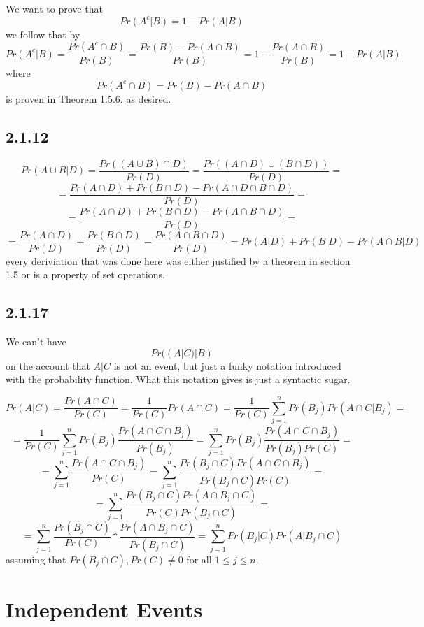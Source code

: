 \documentclass[11pt,oneside,titlepage]{book}
\begin{document}
We want to prove that
$$Pr(A^c|B) = 1 - Pr(A|B)$$
we follow that by
$$Pr(A^c|B) = \frac{Pr(A^c \cap B)}{Pr(B)} = \frac{Pr(B) - Pr(A \cap B)}{Pr(B)} =
1 - \frac{Pr(A \cap B)}{Pr(B)} = 1 - Pr(A|B)$$
where
$$Pr(A^c \cap B) = Pr(B) - Pr(A \cap B)$$
is proven in Theorem 1.5.6.
as desired.

\subsection*{2.1.12}

$$Pr(A \cup B | D) = \frac{Pr((A \cup B) \cap D)}{Pr(D)} =
\frac{Pr((A \cap D) \cup (B \cap D))}{Pr(D)} = $$
$$ =
\frac{Pr(A \cap D) + Pr(B \cap D) - Pr(A \cap D \cap B \cap D)}{Pr(D)} = $$
$$ =  \frac{Pr(A \cap D) + Pr(B \cap D) - Pr(A \cap B \cap D)}{Pr(D)} =  $$
$$ =  \frac{Pr(A \cap D)}{Pr(D)} + \frac{Pr(B \cap D)}{Pr(D)}
- \frac{Pr(A \cap B \cap D)}{Pr(D)} =  Pr(A|D) + Pr(B|D) - Pr(A \cap B|D)$$
every deriviation that was done here was either justified by a theorem in section 1.5 or
is a property of set operations.

\subsection*{2.1.17}

We can't have
$$Pr((A|C)|B)$$
on the account that $A|C$ is not an event, but just a funky notation introduced with the
probability function. What this notation gives is just a syntactic sugar.

$$Pr(A|C) = \frac{Pr(A \cap C)}{Pr(C)} = \frac{1}{Pr(C)} Pr(A \cap C) =
\frac{1}{Pr(C)} \sum_{j = 1}^n{Pr(B_j)Pr(A \cap C | B_j)} = 
$$
$$ =
\frac{1}{Pr(C)} \sum_{j = 1}^n{Pr(B_j)\frac{Pr(A \cap C \cap B_j)}{Pr(B_j)}} =
\sum_{j = 1}^n{Pr(B_j)\frac{Pr(A \cap C \cap B_j)}{Pr(B_j)Pr(C)}} = 
$$
$$ =
\sum_{j = 1}^n{\frac{Pr(A \cap C \cap B_j)}{Pr(C)}} =
\sum_{j = 1}^n{\frac{Pr(B_j \cap C) Pr(A \cap C \cap B_j)}{Pr(B_j \cap C)Pr(C)}} = 
$$
$$ =
\sum_{j = 1}^n{\frac{Pr(B_j \cap C) Pr(A  \cap B_j \cap C)}{Pr(C) Pr(B_j \cap C)}} = 
$$
$$ = \sum_{j = 1}^n{\frac{Pr(B_j \cap C)}{Pr(C)} *
  \frac{Pr(A \cap B_j \cap C)}{Pr(B_j \cap C)}} = \sum_{j = 1}^n{Pr(B_j|C)Pr(A|B_j \cap C)}$$
assuming that $Pr(B_j \cap C), Pr(C) \neq 0$ for all $1 \leq j \leq n$.

\section{Independent Events}
\end{document}

